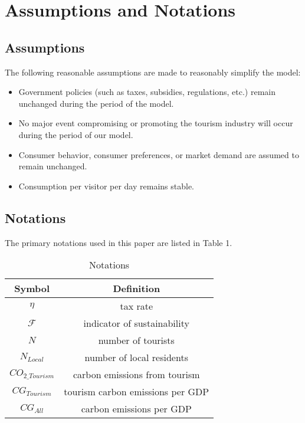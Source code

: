 \section{Assumptions and Notations}

\subsection{Assumptions}

The following reasonable assumptions are made to reasonably simplify the model:

\begin{itemize}
  \item Government policies (such as taxes, subsidies, regulations, etc.) remain unchanged during the period of the model.
  \item No major event compromising or promoting the tourism industry will occur during the period of our model.
  \item Consumer behavior, consumer preferences, or market demand are assumed to remain unchanged.
  \item Consumption per visitor per day remains stable.
\end{itemize}


\subsection{Notations}

The primary notations used in this paper are listed in Table 1.

\begin{table}[!htbp]
  \begin{center}
  \caption{Notations}
  \begin{tabular}{cc}
    \toprule
    \multicolumn{1}{m{3cm}}{\centering Symbol}
    &\multicolumn{1}{m{8cm}}{\centering Definition}\\
    \midrule
    $\eta$         &   tax rate\\
    $\mathcal{F}$         &   indicator of sustainability\\
    $N$    &   number of tourists\\
    $N_{Local}$    &   number of local residents\\
    $CO_{2\_Tourism}$    &   carbon emissions from tourism\\
    $CG_{Tourism}$    &   tourism carbon emissions per GDP\\
    $CG_{All}$    &   carbon emissions per GDP\\
    \bottomrule
  \end{tabular}
  \end{center}
\end{table}